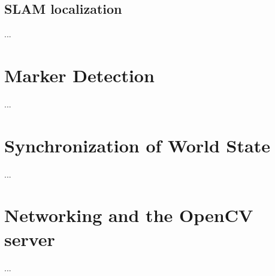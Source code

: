 		\subsection{SLAM localization} \label{ssec:slamloc}
			...

	\section{Marker Detection} \label{sec:markerdetection}
		...
		
	\section{Synchronization of World State} \label{sec:synchronization}
		...
		
	\section{Networking and the OpenCV server} \label{sec:network}
		...
	